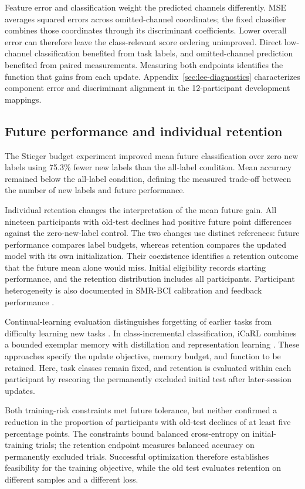 \documentclass[11pt,a4paper]{article}
\begin{document}
Feature error and classification weight the predicted channels differently. MSE averages squared errors across omitted-channel coordinates; the fixed classifier combines those coordinates through its discriminant coefficients. Lower overall error can therefore leave the class-relevant score ordering unimproved. Direct low-channel classification benefited from task labels, and omitted-channel prediction benefited from paired measurements. Measuring both endpoints identifies the function that gains from each update. Appendix~\ref{sec:lee-diagnostics} characterizes component error and discriminant alignment in the 12-participant development mappings.

\subsection{Future performance and individual retention}

The Stieger budget experiment improved mean future classification over zero new labels using 75.3\% fewer new labels than the all-label condition. Mean accuracy remained below the all-label condition, defining the measured trade-off between the number of new labels and future performance.

Individual retention changes the interpretation of the mean future gain. All nineteen participants with old-test declines had positive future point differences against the zero-new-label control. The two changes use distinct references: future performance compares label budgets, whereas retention compares the updated model with its own initialization. Their coexistence identifies a retention outcome that the future mean alone would miss. Initial eligibility records starting performance, and the retention distribution includes all participants. Participant heterogeneity is also documented in SMR-BCI calibration and feedback performance \cite{sannelli2019}.

Continual-learning evaluation distinguishes forgetting of earlier tasks from difficulty learning new tasks \cite{chaudhry2018,delange2022}. In class-incremental classification, iCaRL combines a bounded exemplar memory with distillation and representation learning \cite{rebuffi2017}. These approaches specify the update objective, memory budget, and function to be retained. Here, task classes remain fixed, and retention is evaluated within each participant by rescoring the permanently excluded initial test after later-session updates.

Both training-risk constraints met future tolerance, but neither confirmed a reduction in the proportion of participants with old-test declines of at least five percentage points. The constraints bound balanced cross-entropy on initial-training trials; the retention endpoint measures balanced accuracy on permanently excluded trials. Successful optimization therefore establishes feasibility for the training objective, while the old test evaluates retention on different samples and a different loss.
\end{document}
